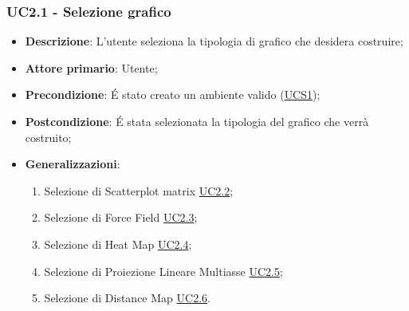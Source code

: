 \subsubsection{UC2.1 - Selezione grafico}
\label{ssub:uc2.1}
\begin{itemize}

	\item \textbf{Descrizione}: L’utente seleziona la tipologia di grafico che desidera costruire;

    \item \textbf{Attore primario}: Utente;

	\item \textbf{Precondizione}:   É stato creato un ambiente valido (\hyperref[sub:uc1]{UCS1});
	
    \item \textbf{Postcondizione}:  É stata selezionata la tipologia del grafico che verrà costruito;

	\item \textbf{Generalizzazioni}:
		\begin{enumerate}
			
			\item Selezione di Scatterplot matrix \hyperref[ssub:uc2.2]{UC2.2};
			\item Selezione di Force Field \hyperref[ssub:uc2.3]{UC2.3};
			\item Selezione di Heat Map \hyperref[ssub:uc2.4]{UC2.4};
			\item Selezione di Proiezione Lineare Multiasse \hyperref[ssub:uc2.5]{UC2.5};
			\item Selezione di Distance Map \hyperref[ssub:uc2.6]{UC2.6}.
			
		\end{enumerate}

\end{itemize}


